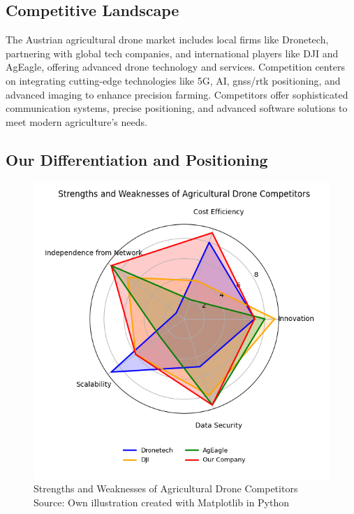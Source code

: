 \subsection{Competitive Landscape}

The Austrian agricultural drone market includes local firms like Dronetech, partnering with global tech companies, and international players like DJI and AgEagle, offering advanced drone technology and services. Competition centers on integrating cutting-edge technologies like 5G, AI, \acrshort{gnss}/\acrshort{rtk} positioning, and advanced imaging to enhance precision farming. Competitors offer sophisticated communication systems, precise positioning, and advanced software solutions to meet modern agriculture's needs.

\subsection{Our Differentiation and Positioning}

\begin{figure}[H] 
	\centering 
	\hspace*{-1.5cm} 
	\includegraphics[width=400pt]{figures/competitors.png} 
	\caption{Strengths and Weaknesses of Agricultural Drone Competitors \\ \small Source: Own illustration created with Matplotlib in Python}
	\label{fig:strengths_weaknesses} 
\end{figure}

